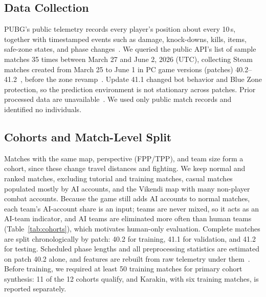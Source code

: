 \documentclass[sigconf,anonymous]{acmart}
\begin{document}
\subsection{Data Collection}
\label{sec:method:data}
PUBG's public telemetry records every player's position about every 10\,s, together with timestamped events such as damage, knock-downs, kills, items, safe-zone states, and phase changes~\cite{PUBGAPI}. We queried the public API's list of sample matches 35 times between March 27 and June 2, 2026 (UTC), collecting Steam matches created from March 25 to June 1 in PC game versions (patches) 40.2--41.2~\cite{PUBGPatchNotes2026}, before the zone revamp~\cite{PUBGBlueZone2026}. Update 41.1 changed bot behavior and Blue Zone protection, so the prediction environment is not stationary across patches. Prior processed data are unavailable~\cite{Sagong25a,KRAFTON}. We used only public match records and identified no individuals.

\subsection{Cohorts and Match-Level Split}
\label{sec:method:cohort}
Matches with the same map, perspective (FPP/TPP), and team size form a cohort, since these change travel distances and fighting. We keep normal and ranked matches, excluding tutorial and training matches, casual matches populated mostly by AI accounts, and the Vikendi map with many non-player combat accounts. Because the game still adds AI accounts to normal matches, each team's AI-account share is an input; teams are never mixed, so it acts as an AI-team indicator, and AI teams are eliminated more often than human teams (Table~\ref{tab:cohorts}), which motivates human-only evaluation. Complete matches are split chronologically by patch: 40.2 for training, 41.1 for validation, and 41.2 for testing. Scheduled phase lengths and all preprocessing statistics are estimated on patch 40.2 alone, and features are rebuilt from raw telemetry under them~\cite{Kaufman12}. Before training, we required at least 50 training matches for primary cohort synthesis: 11 of the 12 cohorts qualify, and Karakin, with six training matches, is reported separately.
\end{document}
